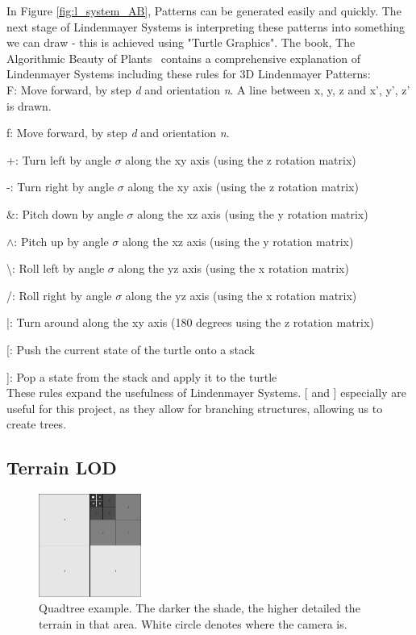 \documentclass[a4paper,10pt]{report}
\begin{document}
In Figure \ref{fig:l_system_AB}, Patterns can be generated easily and quickly. The next stage of Lindenmayer Systems is interpreting these patterns into something we can draw - this is achieved using "Turtle Graphics". The book, The Algorithmic Beauty of Plants~\cite{prusinkiewicz2012algorithmic} contains a comprehensive explanation of Lindenmayer Systems including these rules for 3D Lindenmayer Patterns:\\

F: Move forward, by step \textit{d} and orientation \textit{n}. A line between {x, y, z} and {x', y', z'} is drawn.

f: Move forward, by step \textit{d} and orientation \textit{n}. 

+: Turn left by angle $\sigma$ along the xy axis (using the z rotation matrix)

-: Turn right by angle $\sigma$ along the xy axis (using the z rotation matrix)

\&: Pitch down by angle $\sigma$ along the xz axis (using the y rotation matrix)

$\wedge$: Pitch up by angle $\sigma$ along the xz axis (using the y rotation matrix)

\textbackslash: Roll left by angle $\sigma$ along the yz axis (using the x rotation matrix)

/: Roll right by angle $\sigma$ along the yz axis (using the x rotation matrix)

|: Turn around along the xy axis (180 degrees using the z rotation matrix)

[: Push the current state of the turtle onto a stack

]: Pop a state from the stack and apply it to the turtle\\

These rules expand the usefulness of Lindenmayer Systems. [ and ] especially are useful for this project, as they allow for branching structures, allowing us to create trees.

\clearpage
\subsection{Terrain LOD}

\begin{figure}[h!]
    \centering
  \includegraphics[width=0.3\textwidth]{QuadTree.png}
 \caption{Quadtree example. The darker the shade, the higher detailed the terrain in that area. White circle denotes where the camera is.}
 \label{fig:quad_tree}
\end{figure}
\end{document}
